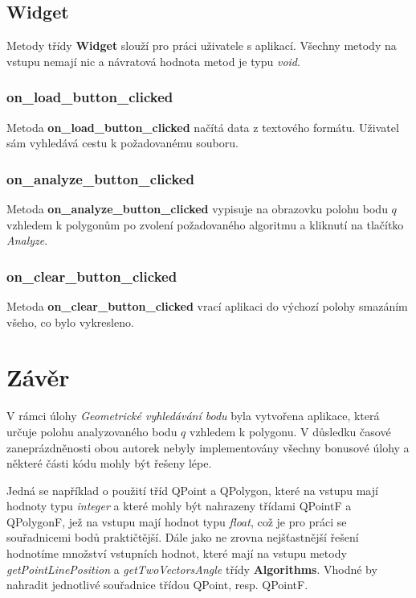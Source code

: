 \documentclass[a4paper, 12pt]{article}
\begin{document}
\subsection{Widget}
Metody třídy \textbf{Widget} slouží pro práci uživatele s aplikací. Všechny metody na vstupu nemají nic a návratová hodnota metod je typu \textsl{void}.

\subsubsection{on\_load\_button\_clicked}
Metoda \textbf{on\_load\_button\_clicked} načítá data z textového formátu. Uživatel sám vyhledává cestu k požadovanému souboru.

\subsubsection{on\_analyze\_button\_clicked}
Metoda \textbf{on\_analyze\_button\_clicked} vypisuje na obrazovku polohu bodu $q$ vzhledem k polygonům po zvolení požadovaného algoritmu a kliknutí na tlačítko \textsl{Analyze}.

\subsubsection{on\_clear\_button\_clicked}
Metoda \textbf{on\_clear\_button\_clicked} vrací aplikaci do výchozí polohy smazáním všeho, co bylo vykresleno. 

\clearpage
\section{Závěr}
V rámci úlohy \textit{Geometrické vyhledávání bodu} byla vytvořena aplikace, která určuje polohu analyzovaného bodu $q$ vzhledem k polygonu. V důsledku časové zaneprázdněnosti obou autorek nebyly implementovány všechny bonusové úlohy a některé části kódu mohly být řešeny lépe.  

Jedná se například o použití tříd QPoint a QPolygon, které na vstupu mají hodnoty typu \textit{integer} a které mohly být nahrazeny třídami QPointF a QPolygonF, jež na vstupu mají hodnot typu \textit{float}, což je pro práci se souřadnicemi bodů praktičtější. Dále jako ne zrovna nejšťastnější řešení hodnotíme množství vstupních hodnot, které mají na vstupu metody \textit{getPointLinePosition} a \textit{getTwoVectorsAngle} třídy \textbf{Algorithms}. Vhodné by nahradit jednotlivé souřadnice třídou QPoint, resp. QPointF. 
\end{document}
